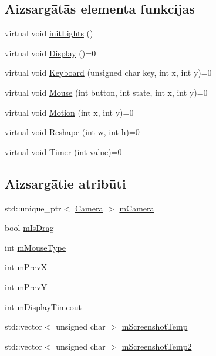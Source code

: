 \subsection*{Aizsargātās elementa funkcijas}
\begin{DoxyCompactItemize}
\item 
virtual void \hyperlink{class_v_p_c_1_1_g_u_i_1_1_g_l_u_t_window_a216d92bb142c672c42a69e5fd9163746}{init\+Lights} ()
\item 
virtual void \hyperlink{class_v_p_c_1_1_g_u_i_1_1_g_l_u_t_window_a6335c4c1f6166156d0330e9af5f4fc31}{Display} ()=0
\item 
virtual void \hyperlink{class_v_p_c_1_1_g_u_i_1_1_g_l_u_t_window_ad1251eb42edd623ecffaaf361ff83bc2}{Keyboard} (unsigned char key, int x, int y)=0
\item 
virtual void \hyperlink{class_v_p_c_1_1_g_u_i_1_1_g_l_u_t_window_a346eb9d90c940048473f7e69bf4feeda}{Mouse} (int button, int state, int x, int y)=0
\item 
virtual void \hyperlink{class_v_p_c_1_1_g_u_i_1_1_g_l_u_t_window_a366b6fed6cd4db1130a54aac12656ba0}{Motion} (int x, int y)=0
\item 
virtual void \hyperlink{class_v_p_c_1_1_g_u_i_1_1_g_l_u_t_window_a5b89e37453f4c46e36b5dd5c2a8257ab}{Reshape} (int w, int h)=0
\item 
virtual void \hyperlink{class_v_p_c_1_1_g_u_i_1_1_g_l_u_t_window_a8e43baa0b17285f1e2cb2135b298d716}{Timer} (int value)=0
\end{DoxyCompactItemize}
\subsection*{Aizsargātie atribūti}
\begin{DoxyCompactItemize}
\item 
std\+::unique\+\_\+ptr$<$ \hyperlink{class_v_p_c_1_1_g_u_i_1_1_camera}{Camera} $>$ \hyperlink{class_v_p_c_1_1_g_u_i_1_1_g_l_u_t_window_a188317ab66f82a4c1752797c8f77cc30}{m\+Camera}
\item 
bool \hyperlink{class_v_p_c_1_1_g_u_i_1_1_g_l_u_t_window_a48731b1b83ad67c05d1fc29460a39079}{m\+Is\+Drag}
\item 
int \hyperlink{class_v_p_c_1_1_g_u_i_1_1_g_l_u_t_window_abcb6dd2e6da3ff86b7d485fc439d6851}{m\+Mouse\+Type}
\item 
int \hyperlink{class_v_p_c_1_1_g_u_i_1_1_g_l_u_t_window_afb53d32a8f4b83476cd57f7b0bdc1b1e}{m\+PrevX}
\item 
int \hyperlink{class_v_p_c_1_1_g_u_i_1_1_g_l_u_t_window_a11ba670d3ec0ac9ae16f276469dcbbe8}{m\+PrevY}
\item 
int \hyperlink{class_v_p_c_1_1_g_u_i_1_1_g_l_u_t_window_a1a0397ed6b305040c02660e4154d3282}{m\+Display\+Timeout}
\item 
std\+::vector$<$ unsigned char $>$ \hyperlink{class_v_p_c_1_1_g_u_i_1_1_g_l_u_t_window_a3fb2ef7f66b526626c242cf35a4af080}{m\+Screenshot\+Temp}
\item 
std\+::vector$<$ unsigned char $>$ \hyperlink{class_v_p_c_1_1_g_u_i_1_1_g_l_u_t_window_a9a373bab4c85c9a39d5b188311509ea6}{m\+Screenshot\+Temp2}
\end{DoxyCompactItemize}


